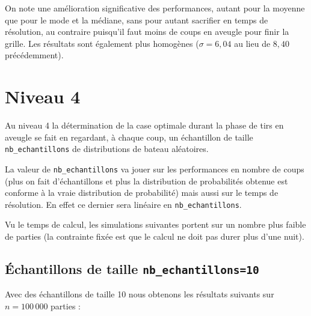 On note une amélioration significative des performances, autant pour la moyenne que pour le mode et la médiane, sans pour autant sacrifier en temps de résolution, au contraire puisqu'il faut moins de coups en aveugle pour finir la grille. Les résultats sont également plus homogènes ($\sigma=6,04$ au lieu de $8,40$ précédemment).

\newpage
\section{Niveau 4}
Au niveau 4 la détermination de la case optimale durant la phase de tirs en aveugle se fait en regardant, à chaque coup, un échantillon de taille \texttt{nb\_echantillons} de distributions de bateau aléatoires.

La valeur de \texttt{nb\_echantillons} va jouer sur les performances en nombre de coups (plus on fait d'échantillons et plus la distribution de probabilités obtenue est conforme à la vraie distribution de probabilité) mais aussi sur le temps de résolution. En effet ce dernier sera linéaire en \texttt{nb\_echantillons}.

Vu le temps de calcul, les simulations suivantes portent sur un nombre plus faible de parties (la contrainte fixée est que le calcul ne doit pas durer plus d'une nuit).
\subsection{Échantillons de taille \texttt{nb\_echantillons=10}}
Avec des échantillons de taille 10 nous obtenons les résultats suivants sur $n=100\,000$ parties :

\begin{center}
\end{center}

